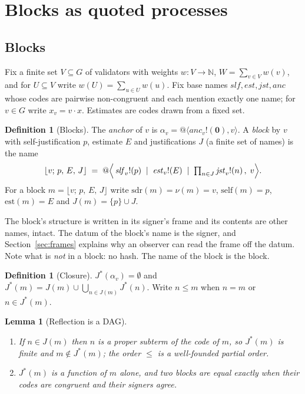 \documentclass[11pt]{article}
\makeatletter
\newtheorem{lemma}[theorem]{Lemma}
\theoremstyle{definition}
\newtheorem{definition}[theorem]{Definition}
\theoremstyle{remark}
\newcommand{\nil}{\mathbf{0}}
\newcommand{\snd}[2]{#1!(#2)}
\newcommand{\qn}[2]{@\langle #1, #2\rangle}
\newcommand{\act}[2]{#1\cdot #2}
\newcommand{\blk}[4]{\lfloor #1;\, #2,\, #3,\, #4\rfloor}
\newcommand{\Jst}{J^{*}}
\newcommand{\slf}{\mathrm{self}}
\newcommand{\est}{\mathrm{est}}
\newcommand{\sender}{\mathrm{sdr}}
\makeatother
\begin{document}
\section{Blocks as quoted processes}\label{sec:blocks}

\subsection{Blocks}

Fix a finite set $V\subseteq G$ of validators with weights $w:V\to\mathbb{N}$,
$W=\sum_{v\in V}w(v)$, and for $U\subseteq V$ write $w(U)=\sum_{u\in U}w(u)$.
Fix base names $\mathit{slf},\mathit{est},\mathit{jst},\mathit{anc}$ whose
codes are pairwise non-congruent and each mention exactly one name; for
$v\in G$ write $x_v=\act{v}{x}$. Estimates are codes drawn from a fixed set.

\begin{definition}[Blocks]\label{def:block}
The \emph{anchor} of $v$ is $\alpha_v=\qn{\snd{\mathit{anc}_v}{\nil}}{v}$. A
\emph{block} by $v$ with self-justification $p$, estimate $E$ and
justifications $J$ (a finite set of names) is the name
\[
\blk{v}{p}{E}{J} \;=\;
@\Bigl\langle\,
\snd{\mathit{slf}_v}{p}\;\mid\;\snd{\mathit{est}_v}{E}\;\mid\;
\textstyle\prod_{n\in J}\snd{\mathit{jst}_v}{n}
\,,\; v\Bigr\rangle .
\]
For a block $m=\blk{v}{p}{E}{J}$ write $\sender(m)=\nu(m)=v$,
$\slf(m)=p$, $\est(m)=E$ and $J(m)=\{p\}\cup J$.
\end{definition}

The block's structure is written in its signer's frame and its contents are
other names, intact. The datum of the block's name is the signer, and
Section~\ref{sec:frames} explains why an observer can read the frame off the
datum. Note what is \emph{not} in a block: no hash. The name of the block is the
block.

\begin{definition}[Closure]
$\Jst(\alpha_v)=\emptyset$ and $\Jst(m)=J(m)\cup\bigcup_{n\in J(m)}\Jst(n)$.
Write $n\le m$ when $n=m$ or $n\in\Jst(m)$.
\end{definition}

\begin{lemma}[Reflection is a DAG]\label{lem:dag}
\begin{enumerate}[label=(\roman*)]
\item If $n\in J(m)$ then $n$ is a proper subterm of the code of $m$, so
  $\Jst(m)$ is finite and $m\notin\Jst(m)$; the order $\le$ is a well-founded
  partial order.
\item $\Jst(m)$ is a function of $m$ alone, and two blocks are equal exactly
  when their codes are congruent and their signers agree.
\end{enumerate}
\end{lemma}
\end{document}
